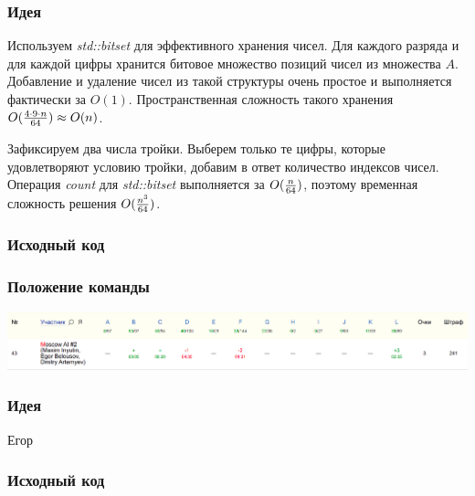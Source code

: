 \documentclass[12pt]{article}
\begin{document}

\subsubsection*{Идея}
Используем \textit{std::bitset} для эффективного хранения чисел. Для каждого разряда и для каждой цифры хранится битовое множество позиций чисел из множества $A$. Добавление и удаление чисел из такой структуры очень простое и выполняется фактически за $O(1)$. Пространственная сложность такого хранения $O({{4 \cdot 9 \cdot n}\over{64}}) \approx O(n)$.

Зафиксируем два числа тройки. Выберем только те цифры, которые удовлетворяют условию тройки, добавим в ответ количество индексов чисел. Операция \textit{count} для \textit{std::bitset} выполняется за $O({n \over 64})$, поэтому временная сложность решения $O({{n ^ 3} \over 64})$.
\subsubsection*{Исходный код}

\subsubsection*{Положение команды}
\includegraphics[scale=0.25]{images/mw4.png}\newline\noindent
\pagebreak


\subsubsection*{Идея}
Егор
\subsubsection*{Исходный код}

\end{document}

